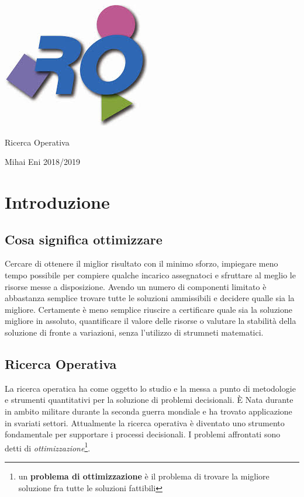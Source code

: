 \documentclass{article}
\begin{document}
\begin{titlepage}
    \centering
    \includegraphics[]{img/roImg.jpeg}
    \par\vspace{4cm}
    {\fontsize{60}{1}\selectfont{} Ricerca Operativa}
    \par\vspace{3cm}
    { \fontsize{50}{1}\selectfont Mihai Eni}
    \vfill
    {\large{2018/2019}}
    \end{titlepage}

\tableofcontents
\newpage

\section{Introduzione}
    \subsection{Cosa significa ottimizzare}
        Cercare di ottenere il miglior risultato con il minimo sforzo, impiegare meno tempo possibile per compiere qualche incarico assegnatoci e sfruttare al meglio le risorse messe a disposizione. Avendo un numero di componenti limitato è abbastanza semplice trovare tutte le soluzioni ammissibili e decidere qualle sia la migliore. Certamente è meno semplice riuscire a certificare quale sia la soluzione migliore in assoluto, quantificare il valore delle risorse o valutare la stabilità della soluzione di fronte a variazioni, senza l'utilizzo di strumneti matematici.
        
    \subsection{Ricerca Operativa}
        La ricerca operatica ha come oggetto lo studio e la messa a punto di metodologie e strumenti quantitativi per la soluzione di problemi decisionali. È Nata durante in ambito militare durante la seconda guerra mondiale e ha trovato applicazione in svariati settori. Attualmente la ricerca operativa è diventato uno strumento fondamentale per supportare i processi decisionali. I problemi affrontati sono detti di \textit{ottimizzazione}\footnote{un \textbf{problema di ottimizzazione} è il problema di trovare la migliore soluzione fra tutte le soluzioni fattibili}.
    
\end{document}
